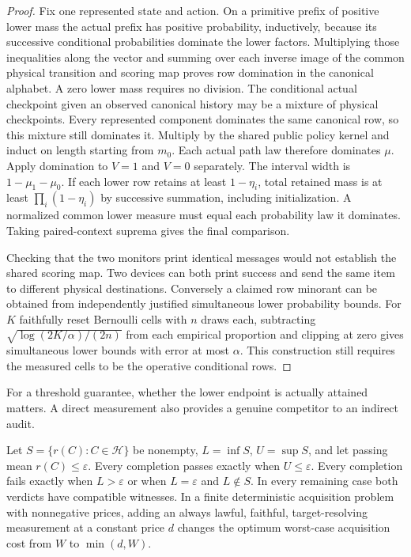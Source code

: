 \begin{proof}

Fix one represented state and action. On a primitive prefix of positive lower mass the actual prefix has positive probability, inductively, because its successive conditional probabilities dominate the lower factors. Multiplying those inequalities along the vector and summing over each inverse image of the common physical transition and scoring map proves row domination in the canonical alphabet. A zero lower mass requires no division. The conditional actual checkpoint given an observed canonical history may be a mixture of physical checkpoints. Every represented component dominates the same canonical row, so this mixture still dominates it. Multiply by the shared public policy kernel and induct on length starting from \(m_0\). Each actual path law therefore dominates \(\mu\). Apply domination to \(V=1\) and \(V=0\) separately. The interval width is \(1-\mu_1-\mu_0\). If each lower row retains at least \(1-\eta_i\), total retained mass is at least \(\prod_i(1-\eta_i)\) by successive summation, including initialization. A normalized common lower measure must equal each probability law it dominates. Taking paired-context suprema gives the final comparison.

Checking that the two monitors print identical messages would not establish the shared scoring map. Two devices can both print success and send the same item to different physical destinations. Conversely a claimed row minorant can be obtained from independently justified simultaneous lower probability bounds. For \(K\) faithfully reset Bernoulli cells with \(n\) draws each, subtracting \(\sqrt{\log(2K/\alpha)/(2n)}\) from each empirical proportion and clipping at zero gives simultaneous lower bounds with error at most \(\alpha\). This construction still requires the measured cells to be the operative conditional rows.

\end{proof}

For a threshold guarantee, whether the lower endpoint is actually attained matters. A direct measurement also provides a genuine competitor to an indirect audit.

\begin{theorem}\label{thm:t19}

Let \(S=\{r(C):C\in\mathcal H\}\) be nonempty, \(L=\inf S\), \(U=\sup S\), and let passing mean \(r(C)\le\varepsilon\). Every completion passes exactly when \(U\le\varepsilon\). Every completion fails exactly when \(L>\varepsilon\) or when \(L=\varepsilon\) and \(L\notin S\). In every remaining case both verdicts have compatible witnesses. In a finite deterministic acquisition problem with nonnegative prices, adding an always lawful, faithful, target-resolving measurement at a constant price \(d\) changes the optimum worst-case acquisition cost from \(W\) to \(\min(d,W)\).

\end{theorem}


